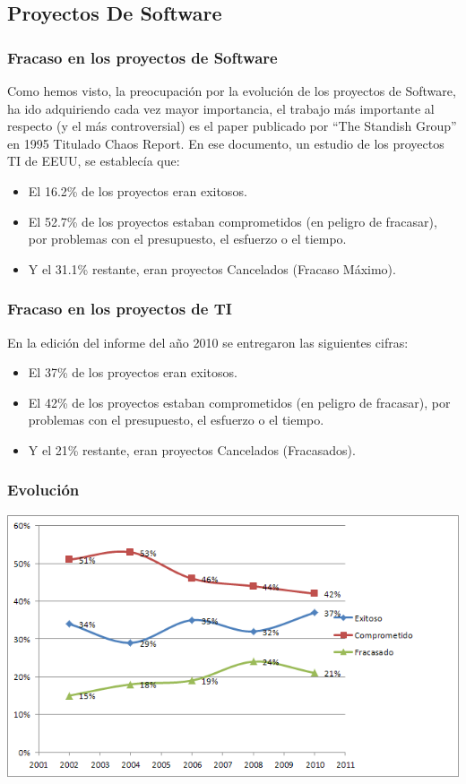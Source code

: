 \documentclass[12pt]{beamer}
\begin{document}
\subsection{Proyectos De Software}
\begin{frame}
\frametitle{Fracaso en los proyectos de Software}
Como hemos visto, la preocupación por la evolución de los proyectos de Software, ha ido adquiriendo cada vez mayor importancia, 
el trabajo más importante al respecto (y el más controversial) es el paper publicado por ``The Standish Group'' en 1995 
Titulado \alert{Chaos Report}. En ese documento, un estudio de los proyectos TI de EEUU, se establecía que:
\begin{itemize}
 \item<2-> El 16.2\% de los proyectos eran exitosos.
 \item<3-> El 52.7\% de los proyectos estaban comprometidos (en peligro de fracasar), por problemas con el presupuesto, el esfuerzo o el tiempo.
 \item<4-> Y el 31.1\% restante, eran proyectos Cancelados (Fracaso Máximo).
\end{itemize}
\end{frame}

\begin{frame}
\frametitle{Fracaso en los proyectos de TI}
En la edición del informe del año 2010 se entregaron las siguientes cifras:
\begin{itemize}
 \item<2-> El 37\% de los proyectos eran exitosos.
 \item<3-> El 42\% de los proyectos estaban comprometidos (en peligro de fracasar), por problemas con el presupuesto, el esfuerzo o el tiempo.
 \item<4-> Y el 21\% restante, eran proyectos Cancelados (Fracasados).
\end{itemize}
\end{frame}

\begin{frame}
 \frametitle{Evolución}
 \begin{center}
    \includegraphics[scale=0.5]{img/evolucion.png}
 \end{center}
\end{frame}
\end{document}
